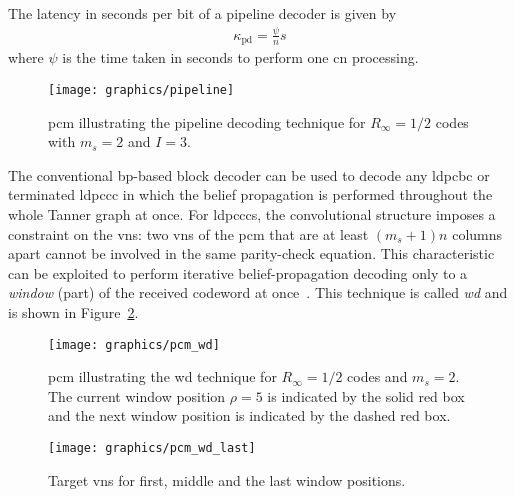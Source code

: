 The latency in seconds per bit of a pipeline decoder is given by
\begin{align}
\kappa_{\text{pd}}=\frac{\psi}{n}s
\end{align}
where $\psi$ is the time taken in seconds to perform one \ac{cn} processing.

\begin{figure}[htbp]
  \centering
  \texttt{[image: graphics/pipeline]}
  \caption{\ac{pcm} illustrating the pipeline decoding technique for $R_\infty=1/2$ codes with $m_s=2$ and $I=3$.}
  \label{fig:pipeline}
\end{figure}

The conventional \ac{bp}-based block decoder can be used to decode any \ac{ldpcbc} or terminated \ac{ldpccc} in which the belief propagation is performed throughout the whole Tanner graph at once. For \acp{ldpccc}, the convolutional structure imposes a constraint on the \acp{vn}: two \acp{vn} of the \ac{pcm} that are at least $(m_s+1)n$ columns apart cannot be involved in the same parity-check equation. This characteristic can be exploited to perform iterative belief-propagation decoding only to a \emph{window} (part) of the received codeword at once~\cite{Iyengar2012}. This technique is called \emph{\ac{wd}} and is shown in Figure~\ref{fig:wd}.
\begin{figure}[htbp]
  \centering
  \texttt{[image: graphics/pcm\_wd]}
  \caption{\ac{pcm} illustrating the \acl{wd} technique for $R_\infty=1/2$ codes and $m_s=2$. The current window position $\rho=5$ is indicated by the solid red box and the next window position is indicated by the dashed red box.}
  \label{fig:wd}
\end{figure}

\begin{figure}[htbp]
  \centering
  \texttt{[image: graphics/pcm\_wd\_last]}
  \caption{Target \acp{vn} for first, middle and the last window positions.}
  \label{fig:wd_last}
\end{figure}

